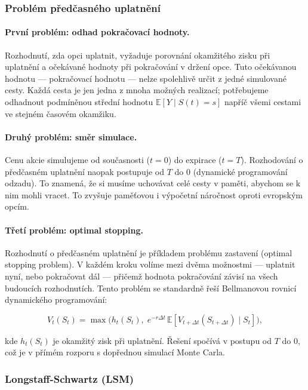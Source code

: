 \documentclass{article}
\begin{document}
\subsubsection{Problém předčasného uplatnění}

\paragraph{První problém: odhad pokračovací hodnoty.}
Rozhodnutí, zda opci uplatnit, vyžaduje porovnání okamžitého zisku při uplatnění a očekávané hodnoty při pokračování v držení opce. Tuto očekávanou hodnotu — pokračovací hodnotu — nelze spolehlivě určit z jedné simulované cesty. Každá cesta je jen jedna z mnoha možných realizací; potřebujeme odhadnout podmíněnou střední hodnotu \(\mathbb{E}[Y \mid S(t) = s]\) napříč všemi cestami ve stejném časovém okamžiku.

\paragraph{Druhý problém: směr simulace.}
Cenu akcie simulujeme od současnosti (\(t = 0\)) do expirace (\(t = T\)). Rozhodování o předčasném uplatnění naopak postupuje od \(T\) do \(0\) (dynamické programování odzadu). To znamená, že si musíme uchovávat celé cesty v paměti, abychom se k nim mohli vracet. To zvyšuje paměťovou i výpočetní náročnost oproti evropským opcím.

\paragraph{Třetí problém: optimal stopping.}
Rozhodnutí o předčasném uplatnění je příkladem problému zastavení (optimal stopping problem). V každém kroku volíme mezi dvěma možnostmi — uplatnit nyní, nebo pokračovat dál — přičemž hodnota pokračování závisí na všech budoucích rozhodnutích. Tento problém se standardně řeší Bellmanovou rovnicí dynamického programování:

\[
V_t(S_t) = \max\!\bigl(h_t(S_t),\; e^{-r\Delta t}\,\mathbb{E}[V_{t+\Delta t}(S_{t+\Delta t}) \mid S_t]\bigr),
\]

kde \(h_t(S_t)\) je okamžitý zisk při uplatnění. Řešení spočívá v postupu od \(T\) do \(0\), což je v přímém rozporu s dopřednou simulací Monte Carla.

\subsubsection{Longstaff-Schwartz (LSM)}
\end{document}
